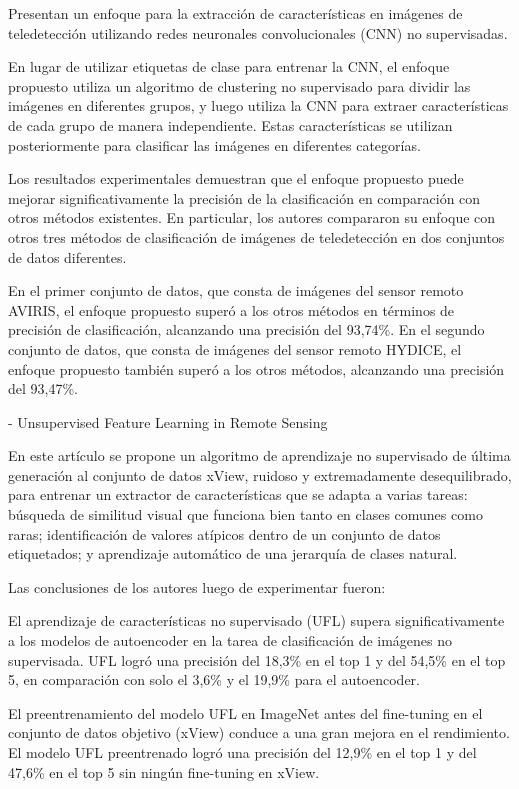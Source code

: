 \documentclass[article]{llncs}
\begin{document}
  Presentan un enfoque para la extracción de características en imágenes de teledetección utilizando redes neuronales 
  convolucionales (CNN) no supervisadas.

  En lugar de utilizar etiquetas de clase para entrenar la CNN, el enfoque propuesto utiliza un algoritmo de clustering 
  no supervisado para dividir las imágenes en diferentes grupos, y luego utiliza la CNN para extraer características de 
  cada grupo de manera independiente. Estas características se utilizan posteriormente para clasificar las imágenes en 
  diferentes categorías.

  Los resultados experimentales demuestran que el enfoque propuesto puede mejorar significativamente la precisión de la 
  clasificación en comparación con otros métodos existentes. En particular, los autores compararon su enfoque con otros 
  tres métodos de clasificación de imágenes de teledetección en dos conjuntos de datos diferentes.

  En el primer conjunto de datos, que consta de imágenes del sensor remoto AVIRIS, el enfoque propuesto superó a los 
  otros métodos en términos de precisión de clasificación, alcanzando una precisión del 93,74\%. En el segundo conjunto 
  de datos, que consta de imágenes del sensor remoto HYDICE, el enfoque propuesto también superó a los otros métodos, 
  alcanzando una precisión del 93,47\%.

- Unsupervised Feature Learning in Remote Sensing

  En este artículo se propone un algoritmo de aprendizaje no supervisado de última generación al conjunto de datos xView, 
  ruidoso y extremadamente desequilibrado, para entrenar un extractor de características que se adapta a varias tareas: 
  búsqueda de similitud visual que funciona bien tanto en clases comunes como raras; identificación de valores atípicos 
  dentro de un conjunto de datos etiquetados; y aprendizaje automático de una jerarquía de clases natural.

  Las conclusiones de los autores luego de experimentar fueron:

  El aprendizaje de características no supervisado (UFL) supera significativamente a los modelos de autoencoder en la 
  tarea de clasificación de imágenes no supervisada. UFL logró una precisión del 18,3\% en el top 1 y del 54,5\% en el 
  top 5, en comparación con solo el 3,6\% y el 19,9\% para el autoencoder.

  El preentrenamiento del modelo UFL en ImageNet antes del fine-tuning en el conjunto de datos objetivo (xView) conduce 
  a una gran mejora en el rendimiento. El modelo UFL preentrenado logró una precisión del 12,9\% en el top 1 y del 47,6\% 
  en el top 5 sin ningún fine-tuning en xView.
\end{document}
